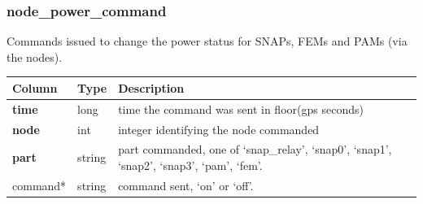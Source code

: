 \documentclass{article}
\begin{document}
{\subsubsection{node\_power\_command}
Commands issued to change the power status for SNAPs, FEMs and PAMs (via the nodes).
\begin{center}
 \begin{tabular}{| p{4cm} | p{2cm} | p{10cm} |}
\hline
 {\bf Column} & {\bf Type}  & {\bf Description} \\ [0.5ex]  \hline\hline
\textbf{time} & long & time the command was sent in floor(gps seconds)\\ \hline
\textbf{node} & int & integer identifying the node commanded \\ \hline
\textbf{part} & string & part commanded, one of `snap\_relay', `snap0', `snap1', `snap2', `snap3', `pam', `fem'. \\ \hline
command* & string & command sent, `on' or `off'. \\\hline
\end{tabular}
\end{center}

}
\end{document}
